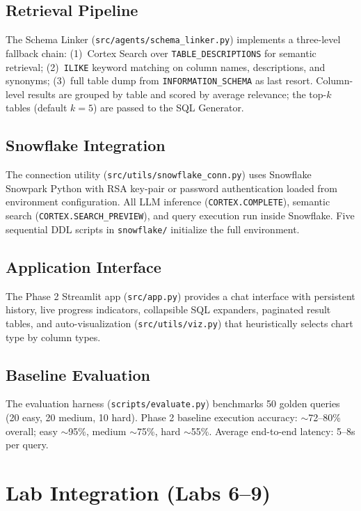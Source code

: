 \documentclass[11pt,letterpaper]{article}
\begin{document}
\subsection{Retrieval Pipeline}

The Schema Linker (\texttt{src/agents/schema\_linker.py}) implements a three-level fallback chain: (1)~Cortex Search over \texttt{TABLE\_DESCRIPTIONS} for semantic retrieval; (2)~\texttt{ILIKE} keyword matching on column names, descriptions, and synonyms; (3)~full table dump from \texttt{INFORMATION\_SCHEMA} as last resort. Column-level results are grouped by table and scored by average relevance; the top-$k$ tables (default $k=5$) are passed to the SQL Generator.

\subsection{Snowflake Integration}

The connection utility (\texttt{src/utils/snowflake\_conn.py}) uses Snowflake Snowpark Python with RSA key-pair or password authentication loaded from environment configuration. All LLM inference (\texttt{CORTEX.COMPLETE}), semantic search (\texttt{CORTEX.SEARCH\_PREVIEW}), and query execution run inside Snowflake. Five sequential DDL scripts in \texttt{snowflake/} initialize the full environment.

\subsection{Application Interface}

The Phase 2 Streamlit app (\texttt{src/app.py}) provides a chat interface with persistent history, live progress indicators, collapsible SQL expanders, paginated result tables, and auto-visualization (\texttt{src/utils/viz.py}) that heuristically selects chart type by column types.

\subsection{Baseline Evaluation}

The evaluation harness (\texttt{scripts/evaluate.py}) benchmarks 50 golden queries (20 easy, 20 medium, 10 hard). Phase 2 baseline execution accuracy: $\sim$72--80\% overall; easy $\sim$95\%, medium $\sim$75\%, hard $\sim$55\%. Average end-to-end latency: 5--8s per query.

\section{Lab Integration (Labs 6--9)}
\end{document}
